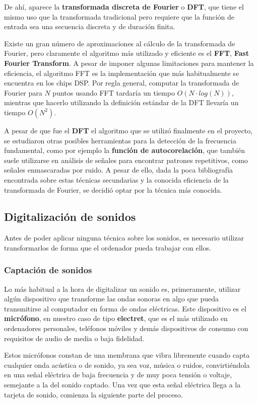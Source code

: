 De ahí, aparece la \textbf{transformada discreta de Fourier} o \textbf{DFT}, que
tiene el mismo uso que la transformada tradicional pero requiere que la función
de entrada sea una secuencia discreta y de duración finita.

Existe un gran número de aproximaciones al cálculo de la transformada de
Fourier, pero claramente el algoritmo más utilizado y eficiente es el
\textbf{FFT}, \textbf{Fast Fourier Transform}. A pesar de imponer algunas
limitaciones para mantener la eficiencia, el algoritmo FFT es la implementación
que más habitualmente se encuentra en los chips DSP. Por regla general, computar
la transformada de Fourier para $N$ puntos usando FFT tardaría un tiempo $O(N
\cdot log(N))$, mientras que hacerlo utilizando la definición estándar de la DFT
llevaría un tiempo $O(N^2)$.

A pesar de que fue el \textbf{DFT} el algoritmo que se utilizó finalmente en el
proyecto, se estudiaron otras posibles herramientas para la detección de la
frecuencia fundamental, como por ejemplo la \textbf{función de autocorelación},
que también suele utilizarse en análisis de señales para encontrar patrones
repetitivos, como señales enmascaradas por ruido. A pesar de ello, dada la poca
bibliografía encontrada sobre estas técnicas secundarias y la conocida
eficiencia de la transformada de Fourier, se decidió optar por la técnica más
conocida.

\subsection{Digitalización de sonidos}

Antes de poder aplicar ninguna técnica sobre los sonidos, es necesario utilizar
transformarlos de forma que el ordenador pueda trabajar con ellos.

\subsubsection{Captación de sonidos}
Lo más habitual a la hora de digitalizar un sonido es, primeramente, utilizar
algún dispositivo que transforme las ondas sonoras en algo que pueda
transmitirse al computador en forma de ondas eléctricas. Este dispositivo es el
\textbf{micrófono}, en nuestro caso de tipo \textbf{electret}, que es el más
utilizado en ordenadores personales, teléfonos móviles y demás dispositivos de
consumo con requisitos de audio de media o baja fidelidad.

Estos micrófonos constan de una membrana que vibra libremente cuando capta
cualquier onda acústica o de sonido, ya sea voz, música o ruidos, convirtiéndola
en una señal eléctrica de baja frecuencia y de muy poca tensión o voltaje,
semejante a la del sonido captado. Una vez que esta señal eléctrica llega a la
tarjeta de sonido, comienza la siguiente parte del proceso.

